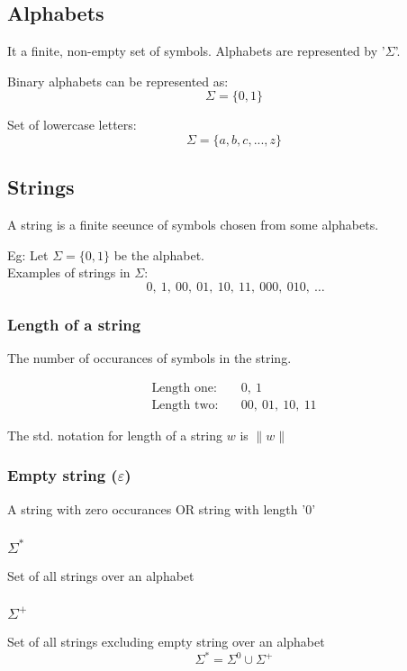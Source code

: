 \documentclass{article}
\begin{document}
\subsection{Alphabets}
It a finite, non-empty set of symbols. Alphabets are represented by '$\Sigma$'.

Binary alphabets can be represented as:
\[\Sigma = \{0, 1\} \]

Set of lowercase letters:
\[\Sigma = \{a, b, c, ... , z\} \]

\subsection{Strings}
A string is a finite seeunce of symbols chosen from some alphabets.

Eg:
Let $\Sigma = \{0, 1\}$ be the alphabet. \\

Examples of strings in $\Sigma$: 
\[
\ 0,\ 1,\ 00,\ 01,\ 10,\ 11,\ 000,\ 010,\ \ldots
\]

\subsubsection{Length of a string}
The number of occurances of symbols in the string.

\begin{align*}
\text{Length one:} \quad & 0,\ 1 \\
\text{Length two:} \quad & 00,\ 01,\ 10,\ 11
\end{align*}

The std. notation for length of a string $w$ is $\|w\|$

\subsubsection{Empty string ($\varepsilon$)}
A string with zero occurances OR string with length '0'

\subsubsection{$\Sigma^*$}
Set of all strings over an alphabet

\subsubsection{$\Sigma^+$}
Set of all strings excluding empty string over an alphabet
\[\Sigma^* = \Sigma^0 \cup \Sigma^+\]
\end{document}

